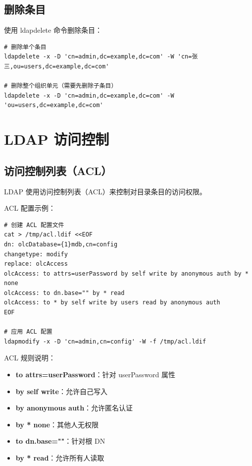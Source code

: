 \documentclass[12pt,UTF8]{ctexbook}
\begin{document}
\section{删除条目}
\label{sec:delete_entry}

使用 ldapdelete 命令删除条目：

\begin{verbatim}
# 删除单个条目
ldapdelete -x -D 'cn=admin,dc=example,dc=com' -W 'cn=张三,ou=users,dc=example,dc=com'

# 删除整个组织单元（需要先删除子条目）
ldapdelete -x -D 'cn=admin,dc=example,dc=com' -W 'ou=users,dc=example,dc=com'
\end{verbatim}

\chapter{LDAP 访问控制}
\label{chap:ldap_access_control}

\section{访问控制列表（ACL）}
\label{sec:acl}

LDAP 使用访问控制列表（ACL）来控制对目录条目的访问权限。

ACL 配置示例：
\begin{verbatim}
# 创建 ACL 配置文件
cat > /tmp/acl.ldif <<EOF
dn: olcDatabase={1}mdb,cn=config
changetype: modify
replace: olcAccess
olcAccess: to attrs=userPassword by self write by anonymous auth by * none
olcAccess: to dn.base="" by * read
olcAccess: to * by self write by users read by anonymous auth
EOF

# 应用 ACL 配置
ldapmodify -x -D 'cn=admin,cn=config' -W -f /tmp/acl.ldif
\end{verbatim}

ACL 规则说明：
\begin{itemize}
    \item \textbf{to attrs=userPassword}：针对 userPassword 属性
    \item \textbf{by self write}：允许自己写入
    \item \textbf{by anonymous auth}：允许匿名认证
    \item \textbf{by * none}：其他人无权限
    \item \textbf{to dn.base=""}：针对根 DN
    \item \textbf{by * read}：允许所有人读取
\end{itemize}
\end{document}

